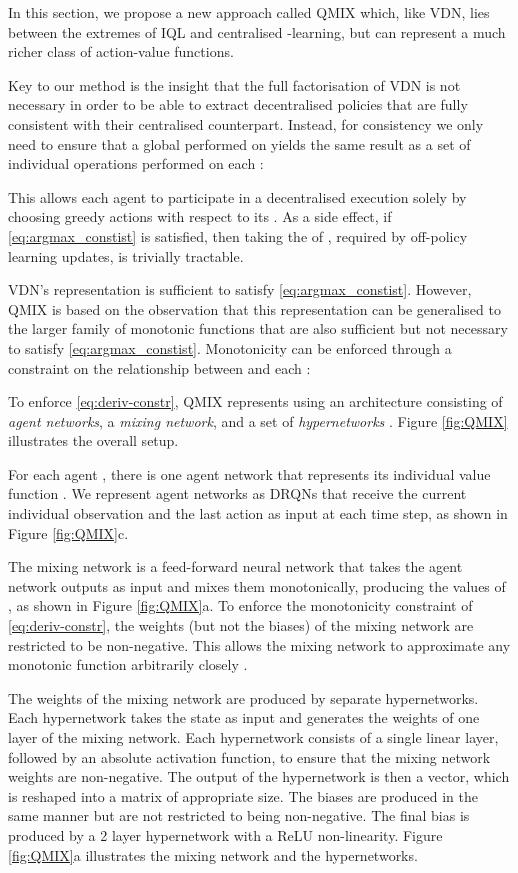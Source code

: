 \documentclass{article}
\begin{document}
\label{sec:methods}

In this section, we propose a new approach called QMIX which, like VDN, lies 
between the extremes of IQL and centralised -learning, but can represent a much richer class of action-value functions. 

Key to our method is the insight that the full factorisation of VDN is not necessary in order to be able to extract decentralised policies that are fully consistent with their centralised counterpart. Instead, for consistency we only need to ensure that a global  performed on  yields the same result as a set of individual  operations performed on each :

This allows each agent  to participate in a decentralised execution solely by choosing greedy actions with respect to its . As a side effect, if \eqref{eq:argmax_constist} is satisfied, then taking the  of , required by off-policy learning updates, is trivially tractable. 

VDN's representation is sufficient to satisfy \eqref{eq:argmax_constist}. However, QMIX is based on the observation that this representation can be generalised to the larger family of monotonic functions that are also sufficient but not necessary to satisfy \eqref{eq:argmax_constist}.   
Monotonicity can be enforced through a constraint on the relationship between  and each :

To enforce \eqref{eq:deriv-constr}, QMIX represents  using an architecture consisting of \textit{agent networks}, a \textit{mixing network}, and a set of \emph{hypernetworks} \cite{ha_hypernetworks_2016}. Figure \ref{fig:QMIX} illustrates the overall setup. 

For each agent , there is one agent network that represents its individual value function . We represent agent networks as DRQNs that receive the current individual observation  and the last action  as input at each time step, as shown in Figure \ref{fig:QMIX}c. 

The mixing network is a feed-forward neural network that takes the agent network outputs as input and mixes them monotonically, producing the values of , as shown in Figure \ref{fig:QMIX}a. To enforce the monotonicity constraint of \eqref{eq:deriv-constr}, the weights (but not the biases) of the mixing network are restricted to be non-negative. This allows the mixing network to approximate any monotonic function arbitrarily closely \citep{Dugas_2009}.


The weights of the mixing network are produced by separate hypernetworks. Each hypernetwork takes the state  as input and generates the weights of one layer of the mixing network. Each hypernetwork consists of a single linear layer, followed by an absolute activation function, to ensure that the mixing network weights are non-negative. The output of the hypernetwork is then a vector, which is reshaped into a matrix of appropriate size. The biases are produced in the same manner but are not restricted to being non-negative. The final bias is produced by a 2 layer hypernetwork with a ReLU non-linearity. Figure \ref{fig:QMIX}a illustrates the mixing network and the hypernetworks.
\end{document}
